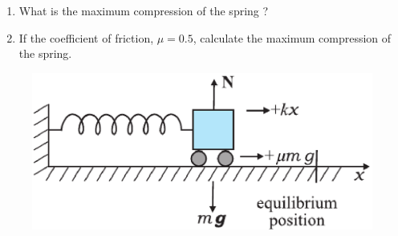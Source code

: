 \begin{enumerate}[label=\arabic*.,ref=\thesection.\theenumi]
\begin{enumerate}
\item What is the maximum compression of the spring ?
\item If the coefficient of friction, $\mu= 0.5$,  calculate the maximum compression of the spring.
\end{enumerate}
\begin{figure}[!ht]
\centering
\includegraphics[width=\columnwidth]{./figs/11-1/6/6.9.eps}
\caption{}
\label{fig:6.9}
\end{figure}
\end{enumerate}
